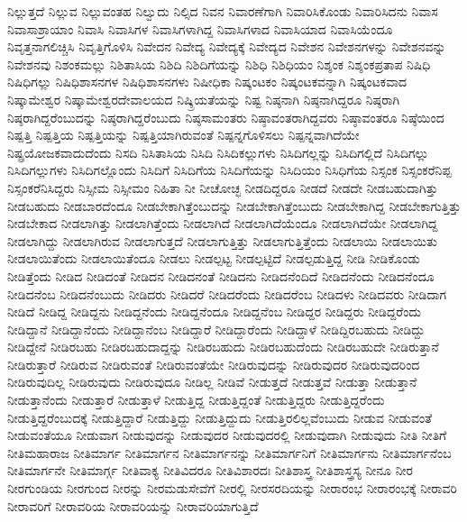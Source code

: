 {ನಿಲ್ಲುತ್ತದೆ
ನಿಲ್ಲುವ
ನಿಲ್ಲುವಂತಹ
ನಿಲ್ವುದು
ನಿಲ್ಸಿದ
ನಿವನ
ನಿವಾರಣೆಗಾಗಿ
ನಿವಾರಿಸಿಕೊಂಡು
ನಿವಾರಿಸಿದನು
ನಿವಾಸ
ನಿವಾಸಾಶ್ರಾಯಾಂ
ನಿವಾಸಿ
ನಿವಾಸಿಗಳ
ನಿವಾಸಿಗಳಾಗಿದ್ದ
ನಿವಾಸಿಗಳಾದ
ನಿವಾಸಿಯಾದ
ನಿವಾಸಿಯೆಂದೂ
ನಿವೃತ್ತನಾಗಲಿಚ್ಚಿಸಿ
ನಿವೃತ್ತಿಗೊಳಿಸಿ
ನಿವೇದನ
ನಿವೇದ್ಯ
ನಿವೇದ್ಯಕ್ಕೆ
ನಿವೇದ್ಯದ
ನಿವೇಶನ
ನಿವೇಶನಗಳನ್ನು
ನಿವೇಶನವನ್ನು
ನಿವೇಶನವು
ನಿಶಂಕಮಲ್ಲು
ನಿಶಿತಾಸಿಯ
ನಿಶಿದಿ
ನಿಶಿದಿಗೆಯನ್ನು
ನಿಶಿಧಿ
ನಿಶಿಧಿಯಂ
ನಿಶ್ಶಂಕ
ನಿಶ್ಶಂಕಪ್ರತಾಪ
ನಿಷಿಧಿ
ನಿಷಿಧಿಗಲ್ಲು
ನಿಷಿಧಿಶಾಸನಗಳ
ನಿಷಿಧಿಶಾಸನಗಳು
ನಿಷೀಧಿಕಾ
ನಿಷ್ಕಂಟಕಂ
ನಿಷ್ಕಂಟಕವನ್ನಾಗಿ
ನಿಷ್ಕಂಟಕವಾದ
ನಿಷ್ಕಾಮೇಶ್ವರ
ನಿಷ್ಕಾಮೇಶ್ವರದೇವಾಲಯದ
ನಿಷ್ಕ್ರಿಯತೆಯನ್ನು
ನಿಷ್ಟ
ನಿಷ್ಠನಾಗಿ
ನಿಷ್ಠನಾಗಿದ್ದರೂ
ನಿಷ್ಠರಾಗಿ
ನಿಷ್ಠರಾಗಿದ್ದರೆಂಬುದನ್ನು
ನಿಷ್ಠರಾಗಿದ್ದರೆಂಬುದು
ನಿಷ್ಠಸಾಮಂತರು
ನಿಷ್ಠಾವಂತರಾಗಿದ್ದವರು
ನಿಷ್ಠಾವಂತರೂ
ನಿಷ್ಠೆಯಿಂದ
ನಿಷ್ಪತ್ತಿ
ನಿಷ್ಪತ್ತಿಯ
ನಿಷ್ಪತ್ತಿಯನ್ನು
ನಿಷ್ಪತ್ತಿಯಾಗಿರುವಂತೆ
ನಿಷ್ಪನ್ನಗೊಳಿಸಲು
ನಿಷ್ಪನ್ನವಾಗಿದೆಯೇ
ನಿಷ್ಪ್ರಯೋಜಕವಾದುದೆಂದು
ನಿಸದಿ
ನಿಸಿತಾಸಿಯ
ನಿಸಿದಿ
ನಿಸಿದಿಕಲ್ಲುಗಳು
ನಿಸಿದಿಗಲ್ಲನ್ನು
ನಿಸಿದಿಗಲ್ಲಿದೆ
ನಿಸಿದಿಗಲ್ಲು
ನಿಸಿದಿಗಲ್ಲುಗಳು
ನಿಸಿದಿಗಲ್ಲೊಂದು
ನಿಸಿದಿಗೆ
ನಿಸಿದಿಗೆಯ
ನಿಸಿದಿಗೆಯನ್ನು
ನಿಸಿದಿಯಂ
ನಿಸಿಧಿಗೆಯ
ನಿಸ್ಸಂಕ
ನಿಸ್ಸಂಕರೆನಿಪ್ಪ
ನಿಸ್ಸಂಕರೆನಿಸಿದ್ದರು
ನಿಸ್ಸೀಮ
ನಿಸ್ಸೀಮಂ
ನಿಹಿತಾ
ನೀ
ನೀಚೋಚ್ಛ
ನೀಡದಿದ್ದರೂ
ನೀಡದೆ
ನೀಡದೇ
ನೀಡಬಹುದಾಗಿತ್ತು
ನೀಡಬಹುದು
ನೀಡಬಾರದೆಂದೂ
ನೀಡಬೇಕಾಗಿತ್ತೆಂಬುದನ್ನು
ನೀಡಬೇಕಾಗಿತ್ತೆಂಬುದು
ನೀಡಬೇಕಾಗಿದ್ದ
ನೀಡಬೇಕಾಗುತ್ತಿತ್ತು
ನೀಡಬೇಕಾದ
ನೀಡಲಾಗಿತ್ತು
ನೀಡಲಾಗಿತ್ತೆಂದು
ನೀಡಲಾಗಿದೆ
ನೀಡಲಾಗಿದೆಯೆಂದೂ
ನೀಡಲಾಗಿದೆಯೇ
ನೀಡಲಾಗಿದ್ದ
ನೀಡಲಾಗಿದ್ದು
ನೀಡಲಾಗಿರುವ
ನೀಡಲಾಗುತ್ತದೆ
ನೀಡಲಾಗುತ್ತಿತ್ತು
ನೀಡಲಾಗುತ್ತಿತ್ತೆಂದು
ನೀಡಲಾಯಿ
ನೀಡಲಾಯಿತು
ನೀಡಲಾಯಿತೆಂದು
ನೀಡಲಾಯಿತೆಂದೂ
ನೀಡಲು
ನೀಡಲ್ಪಟ್ಟ
ನೀಡಲ್ಪಟ್ಟಿದೆ
ನೀಡಲ್ಪಡುತ್ತಿದ್ದ
ನೀಡಿ
ನೀಡಿಕೊಂಡು
ನೀಡಿತ್ತೆಂದು
ನೀಡಿದ
ನೀಡಿದಂತೆ
ನೀಡಿದನ
ನೀಡಿದನಂತೆ
ನೀಡಿದನು
ನೀಡಿದನೆಂದಿದೆ
ನೀಡಿದನೆಂದು
ನೀಡಿದನೆಂದೂ
ನೀಡಿದನೆಂಬ
ನೀಡಿದನೆಂಬುದು
ನೀಡಿದರು
ನೀಡಿದರೆ
ನೀಡಿದರೆಂದು
ನೀಡಿದರೆಂಬ
ನೀಡಿದಳು
ನೀಡಿದವರು
ನೀಡಿದಾಗ
ನೀಡಿದೆ
ನೀಡಿದ್ದ
ನೀಡಿದ್ದನು
ನೀಡಿದ್ದನೆಂದು
ನೀಡಿದ್ದನೆಂದೂ
ನೀಡಿದ್ದನೆಂಬ
ನೀಡಿದ್ದರ
ನೀಡಿದ್ದರು
ನೀಡಿದ್ದರೆಂದು
ನೀಡಿದ್ದಾನೆ
ನೀಡಿದ್ದಾನೆಂದು
ನೀಡಿದ್ದಾನೆಂಬ
ನೀಡಿದ್ದಾರೆ
ನೀಡಿದ್ದಾರೆಂದು
ನೀಡಿದ್ದಾಳೆ
ನೀಡಿದ್ದಿರಬಹುದು
ನೀಡಿದ್ದು
ನೀಡಿದ್ದೇನೆ
ನೀಡಿರಬಹು
ನೀಡಿರಬಹುದಾದ್ದನ್ನು
ನೀಡಿರಬಹುದು
ನೀಡಿರಬಹುದೆಂದು
ನೀಡಿರಬಹುದೇ
ನೀಡಿರುತ್ತಾನೆ
ನೀಡಿರುತ್ತಾರೆ
ನೀಡಿರುವ
ನೀಡಿರುವಂತೆ
ನೀಡಿರುವಂತೆಯೇ
ನೀಡಿರುವುದನ್ನು
ನೀಡಿರುವುದರ
ನೀಡಿರುವುದರಿಂದ
ನೀಡಿರುವುದಿಲ್ಲ
ನೀಡಿರುವುದು
ನೀಡಿರುವುದೂ
ನೀಡಿಲ್ಲ
ನೀಡಿವೆ
ನೀಡುತ್ತದೆ
ನೀಡುತ್ತವೆ
ನೀಡುತ್ತಾ
ನೀಡುತ್ತಾನೆ
ನೀಡುತ್ತಾನೆಂದು
ನೀಡುತ್ತಾರೆ
ನೀಡುತ್ತಾಳೆ
ನೀಡುತ್ತಿದ್ದ
ನೀಡುತ್ತಿದ್ದಂತೆ
ನೀಡುತ್ತಿದ್ದರು
ನೀಡುತ್ತಿದ್ದರೆಂದು
ನೀಡುತ್ತಿದ್ದರೆಂಬುದಕ್ಕೆ
ನೀಡುತ್ತಿದ್ದಾರೆ
ನೀಡುತ್ತಿದ್ದು
ನೀಡುತ್ತಿದ್ದುದು
ನೀಡುತ್ತಿರಲಿಲ್ಲವೆಂಬುದು
ನೀಡುವ
ನೀಡುವಂತೆ
ನೀಡುವಂತೆಯೂ
ನೀಡುವಾಗ
ನೀಡುವುದನ್ನು
ನೀಡುವುದರ
ನೀಡುವುದರಲ್ಲಿ
ನೀಡುವುದಾಗಿ
ನೀಡುವುದು
ನೀತಿ
ನೀತಿಗೆ
ನೀತಿಮಹಾರಾಜ
ನೀತಿಮಾರ್ಗ
ನೀತಿಮಾರ್ಗನ
ನೀತಿಮಾರ್ಗನನ್ನು
ನೀತಿಮಾರ್ಗನಿಗೆ
ನೀತಿಮಾರ್ಗನು
ನೀತಿಮಾರ್ಗನೆಂಬ
ನೀತಿಮಾರ್ಗನೇ
ನೀತಿಮಾರ್ಗ್ಗ
ನೀತಿವಾಕ್ಯ
ನೀತಿವಿದರೂ
ನೀತಿವಿಶಾರದಃ
ನೀತಿಶಾಸ್ತ್ರ
ನೀತಿಶಾಸ್ತ್ರಸ್ಯ
ನೀನೂ
ನೀರ
ನೀರಗುಂಡಿಯ
ನೀರಗುಂದ
ನೀರನ್ನು
ನೀರಮಡುಸೇವೆಗೆ
ನೀರಲ್ಲಿ
ನೀರಸರದಿಯನ್ನು
ನೀರಾರಂಭ
ನೀರಾರಂಭಕ್ಕೆ
ನೀರಾವರಿ
ನೀರಾವರಿಗೆ
ನೀರಾವರಿಯ
ನೀರಾವರಿಯನ್ನು
ನೀರಾವರಿಯಾಗುತ್ತಿದೆ
}
